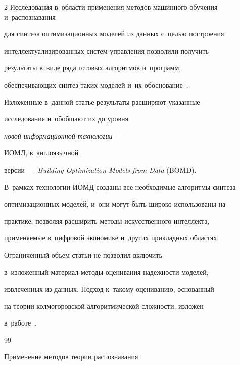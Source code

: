 \begin{multicols}{2}
Исследования в~области применения методов машинного обучения и~распознавания 


для синтеза оптимизационных моделей из данных с~целью построения 


интеллектуализированных сис\-тем управ\-ле\-ния  позволили получить 


результаты в~виде ряда готовых алгоритмов и~программ, 


обеспечивающих синтез таких моделей и~их обоснование~\cite{6-don, 7-don, 8-don}. 


Изложенные в~данной статье результаты расширяют указанные 


исследования и~обобщают их до уровня 


\textit{новой информационной технологии}~--- 


ИОМД, в~англоязычной 


версии~--- \textit{Building Optimization Models from Data} (BOMD). 


В~рамках технологии ИОМД созданы все необходимые алгоритмы синтеза 


оптимизационных моделей, и~они могут быть широко использованы на 


практике, позволяя расширить  методы искусственного интеллекта, 


применяемые в~цифровой экономике и~других прикладных областях.





Ограниченный объем статьи не позволил включить 


в~изложенный материал методы оценивания надежности моделей, 


извлеченных из данных. Подход к~такому оцениванию, основанный 


на теории колмогоровской алгоритмической сложности, изложен 


в~работе~\cite{6-don}.





{\small\frenchspacing


 {%




 \begin{thebibliography}{99}










 Применение методов теории распознавания 



\end{thebibliography}}}
\end{multicols}
